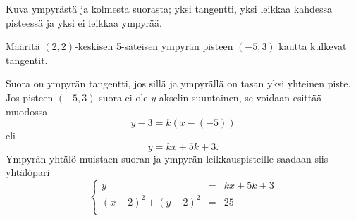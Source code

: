 Kuva ympyrästä ja kolmesta suorasta; yksi tangentti, yksi leikkaa kahdessa pisteessä ja yksi ei leikkaa ympyrää.


\begin{esimerkki}

Määritä $(2,2)$-keskisen 5-säteisen ympyrän pisteen $(-5,3)$ kautta kulkevat tangentit.

\begin{esimratk}
Suora on ympyrän tangentti, jos sillä ja ympyrällä on tasan yksi yhteinen piste. Jos pisteen $(-5,3)$ suora ei ole $y$-akselin suuntainen, se voidaan esittää muodossa
\[
y-3 = k(x-(-5))
\]
eli
\[
y = kx+5k+3.
\]
Ympyrän yhtälö muistaen suoran ja ympyrän leikkauspisteille saadaan siis yhtälöpari
$$\left\{    
    \begin{array}{rcl}
        y &=&kx+5k+3\\
        (x-2)^2+(y-2)^2 &=& 25 \\
    \end{array}
    \right.$$
    

\end{esimratk}
\end{esimerkki}
